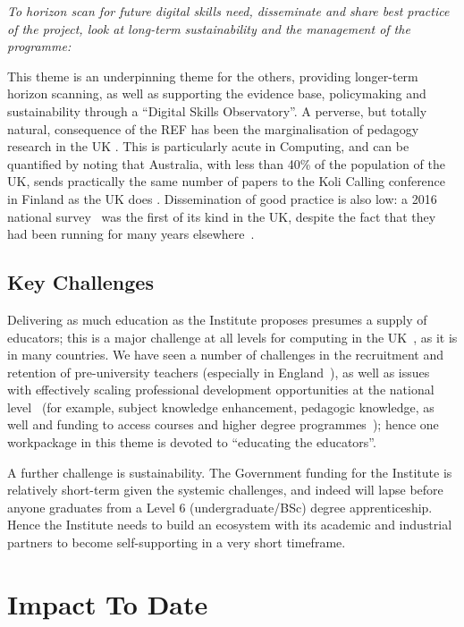 \documentclass[sigconf,anonymous]{acmart}
\begin{document}
{\emph{To horizon scan for future digital skills need, disseminate and
share best practice of the project, look at long-term sustainability
and the management of the programme:}}\newline

\noindent This theme is an underpinning theme for the others,
providing longer-term horizon scanning, as well as supporting the
evidence base, policymaking and sustainability through a ``Digital
Skills Observatory''. A perverse, but totally natural, consequence of
the REF has been the marginalisation of pedagogy research in the UK
\cite{Cottonetal2018a}. This is particularly acute in Computing, and
can be quantified by noting that Australia, with less than 40\% of the
population of the UK, sends practically the same number of papers to
the Koli Calling conference in Finland as the UK does
\cite{Simon2016a}. Dissemination of good practice is also low: a 2016
national survey~\cite{murphy-et-al:programming2017} was the first of
its kind in the UK, despite the fact that they had been running for
many years elsewhere~\cite{simon-et-al:sigcse2018}.

\subsection{Key Challenges}

Delivering as much education as the Institute proposes presumes a
supply of educators; this is a major challenge at all levels for
computing in the UK~\cite{brown-et-al:toce2014}, as it is in many
countries. We have seen a number of challenges in the recruitment and
retention of pre-university teachers (especially in
England~\cite{sentance+waite:2018}), as well as issues with
effectively scaling professional development opportunities at the
national level~\cite{sentance+csizmadia:2017} (for example, subject
knowledge enhancement, pedagogic knowledge, as well and funding to
access courses and higher degree
programmes~\cite{sentance-et-al-wipsce2012}); hence one workpackage in
this theme is devoted to ``educating the educators''.

A further challenge is sustainability. The Government funding for the
Institute is relatively short-term given the systemic challenges, and
indeed will lapse before anyone graduates from a Level 6
(undergraduate/BSc) degree apprenticeship. Hence the Institute needs
to build an ecosystem with its academic and industrial partners to
become self-supporting in a very short timeframe.

\section{Impact To Date}
\end{document}
